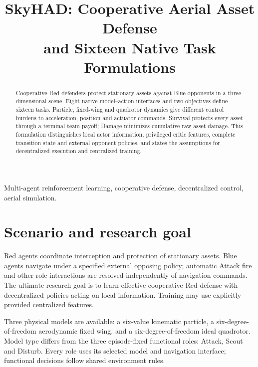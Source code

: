 \documentclass[journal,a4paper,10pt]{IEEEtran}
\begin{document}
\title{SkyHAD: Cooperative Aerial Asset Defense\\and Sixteen Native Task Formulations}
\maketitle
{}\label{common:overview}
\begin{abstract}
Cooperative Red defenders protect stationary assets against Blue opponents in a three-dimensional scene. Eight native model--action interfaces and two objectives define sixteen tasks. Particle, fixed-wing and quadrotor dynamics give different control burdens to acceleration, position and actuator commands. Survival protects every asset through a terminal team payoff; Damage minimizes cumulative raw asset damage. This formulation distinguishes local actor information, privileged critic features, complete transition state and external opponent policies, and states the assumptions for decentralized execution and centralized training.
\end{abstract}
\begin{IEEEkeywords}
Multi-agent reinforcement learning, cooperative defense, decentralized control, aerial simulation.
\end{IEEEkeywords}
\section{Scenario and research goal}
Red agents coordinate interception and protection of stationary assets. Blue agents navigate under a specified external opposing policy; automatic Attack fire and other role interactions are resolved independently of navigation commands. The ultimate research goal is to learn effective cooperative Red defense with decentralized policies acting on local information. Training may use explicitly provided centralized features.

Three physical models are available: a six-value kinematic particle, a six-degree-of-freedom aerodynamic fixed wing, and a six-degree-of-freedom ideal quadrotor. Model type differs from the three episode-fixed functional roles: Attack, Scout and Disturb. Every role uses its selected model and navigation interface; functional decisions follow shared environment rules.
\end{document}

